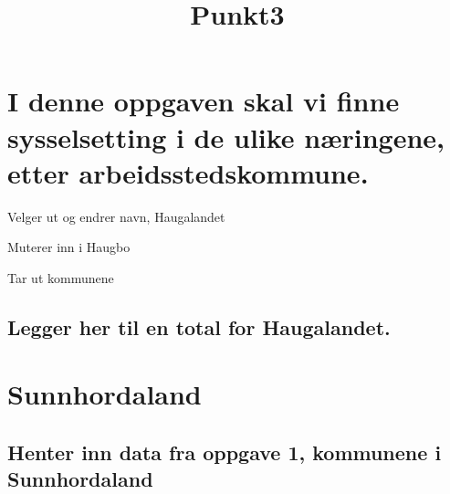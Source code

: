 \documentclass[
]{article}
\title{Punkt3}
\author{}
\date{\vspace{-2.5em}}
\newenvironment{Shaded}{\begin{snugshade}}{\end{snugshade}}
\newcommand{\AttributeTok}[1]{\textcolor[rgb]{0.77,0.63,0.00}{#1}}
\newcommand{\ConstantTok}[1]{\textcolor[rgb]{0.00,0.00,0.00}{#1}}
\newcommand{\FunctionTok}[1]{\textcolor[rgb]{0.00,0.00,0.00}{#1}}
\newcommand{\NormalTok}[1]{#1}
\newcommand{\SpecialCharTok}[1]{\textcolor[rgb]{0.00,0.00,0.00}{#1}}
\begin{document}
\maketitle

\begin{Shaded}
\end{Shaded}

\hypertarget{i-denne-oppgaven-skal-vi-finne-sysselsetting-i-de-ulike-nuxe6ringene-etter-arbeidsstedskommune.}{%
\section{I denne oppgaven skal vi finne sysselsetting i de ulike
næringene, etter
arbeidsstedskommune.}\label{i-denne-oppgaven-skal-vi-finne-sysselsetting-i-de-ulike-nuxe6ringene-etter-arbeidsstedskommune.}}

Velger ut og endrer navn, Haugalandet

Muterer inn i Haugbo

Tar ut kommunene

\hypertarget{legger-her-til-en-total-for-haugalandet.}{%
\subsection{Legger her til en total for
Haugalandet.}\label{legger-her-til-en-total-for-haugalandet.}}

\hypertarget{sunnhordaland}{%
\section{Sunnhordaland}\label{sunnhordaland}}

\hypertarget{henter-inn-data-fra-oppgave-1-kommunene-i-sunnhordaland}{%
\subsection{Henter inn data fra oppgave 1, kommunene i
Sunnhordaland}\label{henter-inn-data-fra-oppgave-1-kommunene-i-sunnhordaland}}
\end{document}
